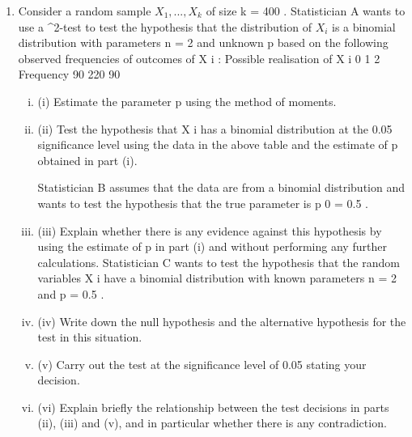 \documentclass[a4paper,12pt]{article}
\begin{document}
\begin{enumerate}

\item Consider a random sample $X_1 , ... , X_k$ of size k = 400 . Statistician A wants to use a
\chi^2-test to test the hypothesis that the distribution of $X_i$ is a binomial distribution
with parameters n = 2 and unknown p based on the following observed frequencies
of outcomes of X i :
Possible realisation of X i 0 1 2
Frequency 90 220 90
\begin{enumerate}[(i)]
\item (i) Estimate the parameter p using the method of moments.
\item (ii) Test the hypothesis that X i has a binomial distribution at the 0.05 significance
level using the data in the above table and the estimate of p obtained in
part (i).

Statistician B assumes that the data are from a binomial distribution and wants to test
the hypothesis that the true parameter is p 0 = 0.5 .
\item (iii)
Explain whether there is any evidence against this hypothesis by using the
estimate of p in part (i) and without performing any further calculations. 
Statistician C wants to test the hypothesis that the random variables X i have a
binomial distribution with known parameters n = 2 and p = 0.5 .
\item (iv) Write down the null hypothesis and the alternative hypothesis for the test in
this situation.

\item (v) Carry out the test at the significance level of 0.05 stating your decision.
\item (vi) Explain briefly the relationship between the test decisions in parts (ii), (iii) and
(v), and in particular whether there is any contradiction.
\end{enumerate}
\end{enumerate}

\end{document}
